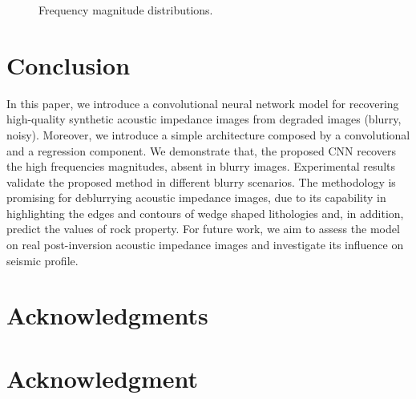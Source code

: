 \documentclass[conference]{IEEEtran}
\begin{document}
\begin{figure}[!t]
{		\label{fig_frequencies_5}}
	\caption{Frequency magnitude distributions.}
	\label{fig_frequencies}
\end{figure}

\section{Conclusion}
In this paper, we introduce a convolutional neural network model for recovering high-quality
synthetic acoustic impedance images from degraded images (blurry, noisy). Moreover,
we introduce a simple architecture composed by a convolutional and a regression component.
We demonstrate that, the proposed CNN recovers the high frequencies magnitudes, absent in blurry images. Experimental results validate the proposed method in different blurry scenarios. The methodology is promising for deblurrying acoustic impedance images, due to its capability in highlighting the edges and contours of wedge shaped lithologies and, in addition,
predict the values of rock property. For future work, we aim to assess the model on real post-inversion acoustic impedance images and investigate its influence on seismic profile.

\ifCLASSOPTIONcompsoc
\section*{Acknowledgments}
\else
\section*{Acknowledgment}
\fi
\end{document}
